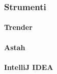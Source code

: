 	\subsubsection{Strumenti}
		\paragraph{Trender}
		\paragraph{Astah}
		\paragraph{IntelliJ IDEA}
			
			

